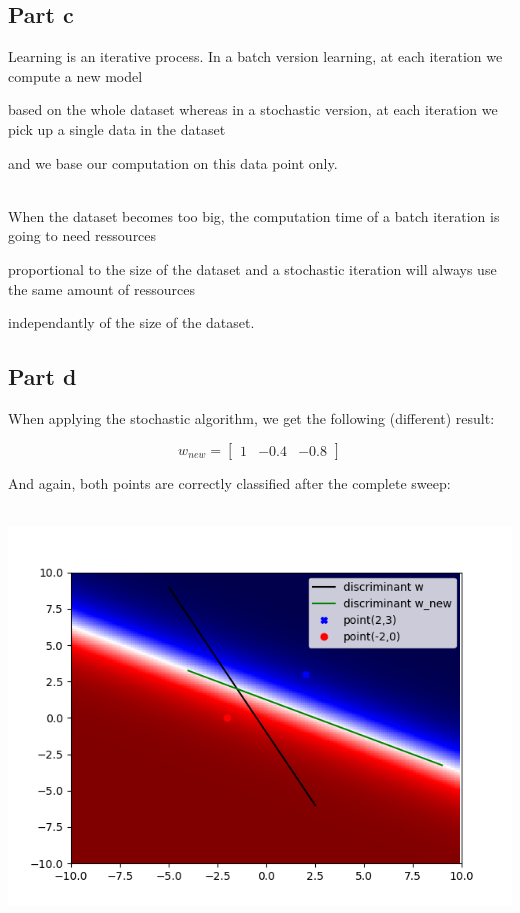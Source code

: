 \documentclass[a4paper, 10pt]{article}
\begin{document}
\subsection{Part c} 

Learning is an iterative process. In a batch version learning, at each iteration we compute a new model 

based on the whole dataset whereas in a stochastic version, at each iteration we pick up a single data in the dataset 

and we base our computation on this data point only. 

\\ 

When the dataset becomes too big, the computation time of a batch iteration is going to need ressources 

proportional to the size of the dataset and a stochastic iteration will always use the same amount of ressources 

independantly of the size of the dataset. 



\subsection{Part d} 

When applying the stochastic algorithm, we get the following (different) result: 

$$ 

w_{new} = \begin{bmatrix}1 & -0.4 & -0.8\end{bmatrix} 

$$ 

And again, both points are correctly classified after the complete sweep: 

\\ 

\includegraphics[scale=0.6]{ex1_d.png} 
\end{document}
